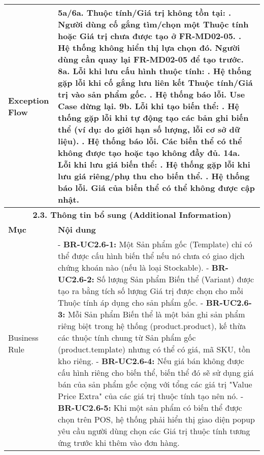 \begin{longtable}{|m{4cm}|p{11cm}|}
\hline
Exception Flow & \textbf{5a/6a. Thuộc tính/Giá trị không tồn tại:} \newline    1. Người dùng cố gắng tìm/chọn một Thuộc tính hoặc Giá trị chưa được tạo ở FR-MD02-05. \newline    2. Hệ thống không hiển thị lựa chọn đó. Người dùng cần quay lại FR-MD02-05 để tạo trước. \newline \textbf{8a. Lỗi khi lưu cấu hình thuộc tính:} \newline    1. Hệ thống gặp lỗi khi cố gắng lưu liên kết Thuộc tính/Giá trị vào sản phẩm gốc. \newline    2. Hệ thống báo lỗi. Use Case dừng lại. \newline \textbf{9b. Lỗi khi tạo biến thể:} \newline    1. Hệ thống gặp lỗi khi tự động tạo các bản ghi biến thể (ví dụ: do giới hạn số lượng, lỗi cơ sở dữ liệu). \newline    2. Hệ thống báo lỗi. Các biến thể có thể không được tạo hoặc tạo không đầy đủ. \newline \textbf{14a. Lỗi khi lưu giá biến thể:} \newline    1. Hệ thống gặp lỗi khi lưu giá riêng/phụ thu cho biến thể. \newline    2. Hệ thống báo lỗi. Giá của biến thể có thể không được cập nhật. \\
\hline
\multicolumn{2}{|c|}{\textbf{2.3. Thông tin bổ sung (Additional Information)}} \\
\hline
\textbf{Mục} & \textbf{Nội dung} \\
\hline
Business Rule & - \textbf{BR-UC2.6-1:} Một Sản phẩm gốc (Template) chỉ có thể được cấu hình biến thể nếu nó chưa có giao dịch chứng khoán nào (nếu là loại Stockable). \newline - \textbf{BR-UC2.6-2:} Số lượng Sản phẩm Biến thể (Variant) được tạo ra bằng tích số lượng Giá trị được chọn cho mỗi Thuộc tính áp dụng cho sản phẩm gốc. \newline - \textbf{BR-UC2.6-3:} Mỗi Sản phẩm Biến thể là một bản ghi sản phẩm riêng biệt trong hệ thống (product.product), kế thừa các thuộc tính chung từ Sản phẩm gốc (product.template) nhưng có thể có giá, mã SKU, tồn kho riêng. \newline - \textbf{BR-UC2.6-4:} Nếu giá bán không được cấu hình riêng cho biến thể, biến thể đó sẽ sử dụng giá bán của sản phẩm gốc cộng với tổng các giá trị "Value Price Extra" của các giá trị thuộc tính tạo nên nó. \newline - \textbf{BR-UC2.6-5:} Khi một sản phẩm có biến thể được chọn trên POS, hệ thống phải hiển thị giao diện popup yêu cầu người dùng chọn các Giá trị thuộc tính tương ứng trước khi thêm vào đơn hàng. \\

\end{longtable}
